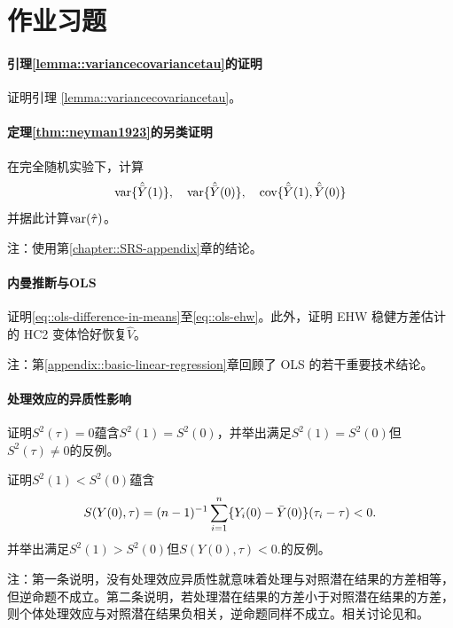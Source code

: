 \section{作业习题}

\paragraph{引理\ref{lemma::variancecovariancetau}的证明}\label{hw::proof-covariance-basic}


证明引理 \ref{lemma::variancecovariancetau}。 


\paragraph{定理\ref{thm::neyman1923}的另类证明}\label{hw::neyman-alternative-proof}


在完全随机实验下，计算
$$
\textup{var}\{  \hat{\bar{Y}}(1)  \} ,\quad
\textup{var}\{  \hat{\bar{Y}}(0)  \} ,\quad
\textup{cov}\{  \hat{\bar{Y}}(1) ,  \hat{\bar{Y}}(0)  \} 
$$
并据此计算$\textup{var}(\hat{\tau} )$。 

注：使用第\ref{chapter::SRS-appendix}章的结论。 





\paragraph{内曼推断与OLS}
\label{hw::neyman-ols-nox}


证明\eqref{eq::ols-difference-in-means}至\eqref{eq::ols-ehw}。此外，证明 EHW 稳健方差估计的 HC2 变体恰好恢复$\hat{V}$。 

注：第\ref{appendix::basic-linear-regression}章回顾了 OLS 的若干重要技术结论。
 
 



\paragraph{处理效应的异质性影响}\label{hw::treatment-effect-heterogeneity-neyman}


证明$S^2(\tau) = 0$蕴含$S^2(1) = S^2(0)$，并举出满足$S^2(1) = S^2(0)$但$S^2(\tau) \neq  0$的反例。 


证明$S^2(1) < S^2(0)$蕴含
$$
S(Y(0),\tau)  = (n-1)^{-1} \sum_{i=1}^n \{ Y_i(0)  - \bar{Y}(0) \} (\tau_i - \tau) <0.
$$
并举出满足$S^2(1) > S^2(0)$但$S(Y(0),\tau)  < 0 .$的反例。



注：第一条说明，没有处理效应异质性就意味着处理与对照潜在结果的方差相等，但逆命题不成立。第二条说明，若处理潜在结果的方差小于对照潜在结果的方差，则个体处理效应与对照潜在结果负相关，逆命题同样不成立。相关讨论见\citet[][page 293]{gerber2012field}和\citet[][Appendix B.3]{ding2019decomposing}。 



